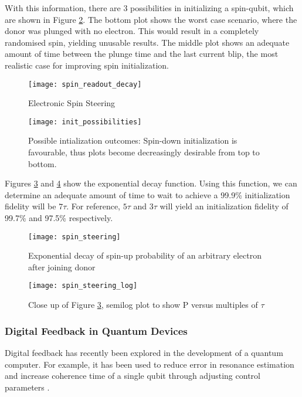 With this information, there are 3 possibilities in initializing a spin-qubit, which are shown in Figure \ref{fig::init_possibilities}. The bottom plot shows the worst case scenario, where the donor was plunged with no electron. This would result in a completely randomised spin, yielding unusable results. The middle plot shows an adequate amount of time between the plunge time and the last current blip, the most realistic case for improving spin initialization.

\begin{figure}[htbp!]
	\centering
	\texttt{[image: spin\_readout\_decay]}
	\caption{Electronic Spin Steering}
	\label{fig::spin_readout_decay}
\end{figure}

\begin{figure}[htbp!]
	\centering
	\texttt{[image: init\_possibilities]}
	\caption{Possible intialization outcomes: Spin-down initialization is favourable, thus plots become decreasingly desirable from top to bottom.}
	\label{fig::init_possibilities}
\end{figure}

Figures \ref{fig::spin_steering} and \ref{fig::spin_steering_log} show the exponential decay function. Using this function, we can determine an adequate amount of time to wait to achieve a 99.9\% initialization fidelity will be $7 \tau$. For reference, $5 \tau$ and $3 \tau$ will yield an initialization fidelity of 99.7\% and 97.5\% respectively.

\begin{figure}[htbp!]
	\centering
	\texttt{[image: spin\_steering]}
	\caption{Exponential decay of spin-up probability of an arbitrary electron after joining donor}
	\label{fig::spin_steering}
\end{figure}


\begin{figure}[htbp!]
	\centering
	\texttt{[image: spin\_steering\_log]}
	\caption{Close up of Figure \ref{fig::spin_steering}, semilog plot to show P versus multiples of $\tau$}
	\label{fig::spin_steering_log}
\end{figure}
\subsubsection{Digital Feedback in Quantum Devices}

Digital feedback has recently been explored in the development of a quantum computer. For example, it has been used to reduce error in resonance estimation \cite{bonato2015optimized} and increase coherence time of a single qubit through adjusting control parameters \cite{shulman2014suppressing}.
